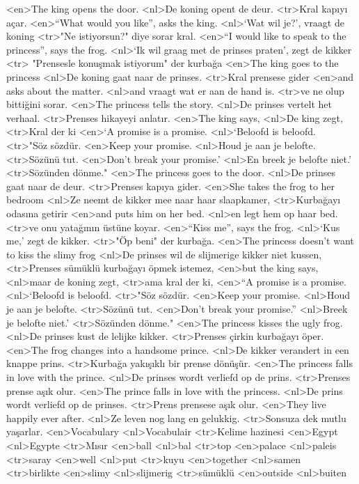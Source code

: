 <en>The king opens the door.
<nl>De koning opent de deur.
<tr>Kral kapıyı açar.
<en>“What would you like”, asks the king.
<nl>`Wat wil je?', vraagt de koning
<tr>"Ne istiyorsun?" diye sorar kral.
<en>“I would like to speak to the princess”, says the frog.
<nl>`Ik wil graag met de prinses praten', zegt de kikker
<tr> "Prensesle konuşmak istiyorum" der kurbağa
<en>The king goes to the princess
<nl>De koning gaat naar de prinses.
<tr>Kral prensese gider
<en>and asks about the matter.
<nl>and vraagt wat er aan de hand is.
<tr>ve ne olup bittiğini sorar.
<en>The princess tells the story.
<nl>De prinses vertelt het verhaal.
<tr>Prenses hikayeyi anlatır.
<en>The king says,
<nl>De king zegt,
<tr>Kral der ki
<en>`A promise is a promise.
<nl>`Beloofd is beloofd.
<tr>"Söz sözdür.
<en>Keep your promise.
<nl>Houd je aan je belofte.
<tr>Sözünü tut.
<en>Don’t break your promise.'
<nl>En breek je belofte niet.'
<tr>Sözünden dönme."
<en>The princess goes to the door.
<nl>De prinses gaat naar de deur.
<tr>Prenses kapıya gider.
<en>She takes the frog to her bedroom
<nl>Ze neemt de kikker mee naar haar slaapkamer,
<tr>Kurbağayı odasına getirir
<en>and puts him on her bed. 
<nl>en legt hem op haar bed.
<tr>ve onu yatağının üstüne koyar.
<en>“Kiss me”, says the frog.
<nl>`Kus me,' zegt de kikker.
<tr>"Öp beni" der kurbağa.
<en>The princess doesn’t want to kiss the slimy frog
<nl>De prinses wil de slijmerige kikker niet kussen,
<tr>Prenses sümüklü kurbağayı öpmek istemez, 
<en>but the king says,
<nl>maar de koning zegt,
<tr>ama kral der ki,
<en>“A promise is a promise.
<nl>`Beloofd is beloofd.
<tr>"Söz sözdür.
<en>Keep your promise.
<nl>Houd je aan je belofte.
<tr>Sözünü tut.
<en>Don’t break your promise.”
<nl>Breek je belofte niet.'
<tr>Sözünden dönme."
<en>The princess kisses the ugly frog.
<nl>De prinses kust de lelijke kikker.
<tr>Prenses çirkin kurbağayı öper.
<en>The frog changes into a handsome prince.
<nl>De kikker verandert in een knappe prins.
<tr>Kurbağa yakışıklı bir prense dönüşür.
<en>The princess falls in love  with the prince.
<nl>De prinses wordt verliefd op de prins.
<tr>Prenses prense aşık olur.
<en>The prince falls in love with the princess.
<nl>De prins wordt verliefd op de prinses.
<tr>Prens prensese aşık olur.
<en>They live happily ever after.
<nl>Ze leven nog lang en gelukkig.
<tr>Sonsuza dek mutlu yaşarlar.
<en>Vocabulary
<nl>Vocabulair
<tr>Kelime hazinesi
<en>Egypt
<nl>Egypte
<tr>Mısır
<en>ball
<nl>bal
<tr>top
<en>palace
<nl>paleis
<tr>saray
<en>well
<nl>put
<tr>kuyu
<en>together
<nl>samen
<tr>birlikte
<en>slimy
<nl>slijmerig
<tr>sümüklü
<en>outside
<nl>buiten

